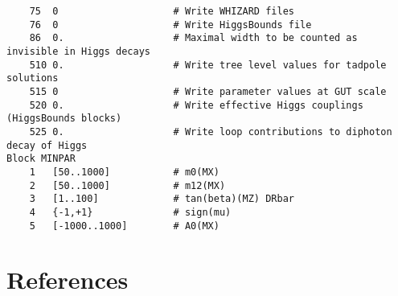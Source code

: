 \documentclass[final,3p,11pt,pdflatex]{elsarticle}
\begin{document}
\begin{lstlisting}
    75  0                    # Write WHIZARD files
    76  0                    # Write HiggsBounds file
    86  0.                   # Maximal width to be counted as invisible in Higgs decays
    510 0.                   # Write tree level values for tadpole solutions
    515 0                    # Write parameter values at GUT scale
    520 0.                   # Write effective Higgs couplings (HiggsBounds blocks)
    525 0.                   # Write loop contributions to diphoton decay of Higgs
Block MINPAR
    1   [50..1000]           # m0(MX)
    2   [50..1000]           # m12(MX)
    3   [1..100]             # tan(beta)(MZ) DRbar
    4   {-1,+1}              # sign(mu)
    5   [-1000..1000]        # A0(MX)
\end{lstlisting}

\clearpage
\section*{References}
\end{document}
